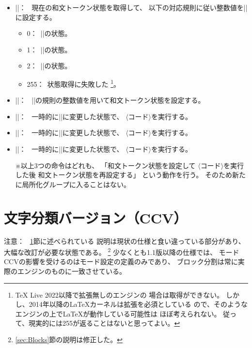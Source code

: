 \documentclass[uplatex,dvipdfmx,a4paper]{jsarticle}
\newcommand{\Meta}[1]{%
  $\langle$\mbox{}\nolinebreak#1\nolinebreak\mbox{}$\rangle$}
\newcommand{\Note}{\par\noindent ※}
\newcommand{\Means}{：~}
\newcommand{\strong}{\textsf}
\begin{document}
\begin{itemize}

\item |\getcjktokenmode|\Means
  現在の和文トークン状態を取得して、
  以下の対応規則に従い整数値を|\thecjktokenmode|に設定する。
  \begin{itemize}
  \item 0\Means |\disablecjktoken|の状態。
  \item 1\Means |\enablecjktoken|の状態。
  \item 2\Means |\forcecjktoken|の状態。
  \item 255\Means 状態取得に失敗した%
  \footnote{{\TeX} Live 2022以降で{\eTeX}拡張無しの{\upTeX}エンジンの
    場合は取得ができない。
    しかし、2014年以降の{\LaTeX}カーネルは{\eTeX}拡張を必須としている
    ので、そのようなエンジンの上で{\LaTeX}が動作している可能性は
    ほぼ考えられない。
    従って、現実的には255が返ることはないと思ってよい。}。
  \end{itemize}

\item |\setcjktokenmode{|\Meta{整数値}|}|\Means
  |\getcjktokenmode|の規則の整数値を用いて和文トークン状態を設定する。

\item |\withcjktokendisabled{|\Meta{コード}|}|\Means
  一時的に|\disablecjktoken|に変更した状態で、
  \Meta{コード}を実行する。
\item |\withcjktokenenabled{|\Meta{コード}|}|\Means
  一時的に|\enablecjktoken|に変更した状態で、
  \Meta{コード}を実行する。
\item |\withcjktokenforced{|\Meta{コード}|}|\Means
  一時的に|\forcecjktoken|に変更した状態で、
  \Meta{コード}を実行する。
\Note 以上3つの命令はどれも、
「和文トークン状態を設定して\Meta{コード}を実行した後
和文トークン状態を再設定する」
という動作を行う。
そのため新たに局所化グループに入ることはない。

\end{itemize}

\section{文字分類バージョン（CCV）}
\label{sec:CCV}

\noindent \strong{注意}\Means
\ref{sec:CCV}節に述べられている
説明は現状の仕様と食い違っている部分があり、
大幅な改訂が必要な状態である。
\footnote{\ref{sec:Blocks}節の説明は修正した。}%
少なくとも1.1版以降の仕様では、
モードCCVの影響を受けるのはモード設定の定義のみであり、
ブロック分割は常に実際のエンジンのものに一致させている。
\end{document}
